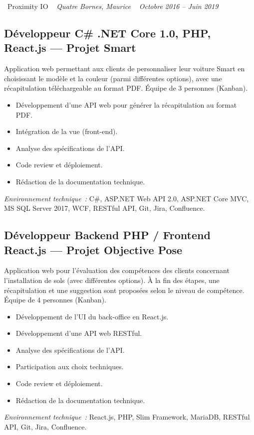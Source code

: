 \documentclass[10pt,a4paper]{article}
\begin{document}
\vspace{10pt}

\noindent\textcolor{primary}{ \faBuilding\ Proximity IO} \quad
\textit{ \small \textcolor{darkgray}{ \faMapMarker\ } Quatre Bornes, Maurice } \hfill
\textit{ \small \textcolor{darkgray}{ \faCalendar\ } Octobre 2016 -- Juin 2019 }

\vspace{4pt}

\subsection*{Développeur C\# .NET Core 1.0, PHP, React.js --- Projet Smart}
\color{darkgray}
Application web permettant aux clients de personnaliser leur voiture Smart en choisissant le modèle et la couleur (parmi différentes options), avec une récapitulation téléchargeable au format PDF. Équipe de 3 personnes (Kanban).
\begin{itemize}
  \item Développement d'une API web pour générer la récapitulation au format PDF.
  \item Intégration de la vue (front-end).
  \item Analyse des spécifications de l'API.
  \item Code review et déploiement.
  \item Rédaction de la documentation technique.
\end{itemize}
\textit{Environnement technique~:} C\#, ASP.NET Web API 2.0, ASP.NET Core MVC, MS SQL Server 2017, WCF, RESTful API, Git, Jira, Confluence.

\vspace{6pt}

\subsection*{Développeur Backend PHP / Frontend React.js --- Projet Objective Pose}
\color{darkgray}
Application web pour l'évaluation des compétences des clients concernant l'installation de sols (avec différentes options). À la fin des étapes, une récapitulation et une suggestion sont proposées selon le niveau de compétence. Équipe de 4 personnes (Kanban).
\begin{itemize}
  \item Développement de l'UI du back-office en React.js.
  \item Développement d'une API web RESTful.
  \item Analyse des spécifications de l'API.
  \item Participation aux choix techniques.
  \item Code review et déploiement.
  \item Rédaction de la documentation technique.
\end{itemize}
\textit{Environnement technique~:} React.js, PHP, Slim Framework, MariaDB, RESTful API, Git, Jira, Confluence.
\end{document}
